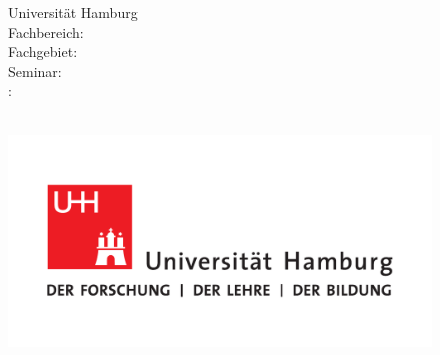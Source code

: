 
\begin{titlepage}

\setcounter{page}{-1}    

\begin{figure}[h]
	\begin{minipage}[t]{8.5cm}
	\flushleft 
			Universität Hamburg \\
			Fachbereich: \fachbereich \\
			Fachgebiet: \fachgebiet \\
			Seminar: \courseOfStudies \\ 
			\supervisorType: \supervisor \\
			\currentSemester \\
	\end{minipage}
	\hfill
   \begin{minipage}[t][2cm][b]{0.4\textwidth}
    \flushright\noindent
    	 \noindent\includegraphics{images/UHH-Logo_2010_Farbe_CMYK.pdf}
    \end{minipage}
\end{figure}

\vspace*{\fill}
\begin{center}
	\vspace{1cm}\noindent {\textbf{\thesisType}} \vspace{0.2cm} \\
	\textbf{\Large \myTitle} \\
	\textbf{\mySubTitle} \\
	\dateOfSubmission \\
\end{center}
\vspace*{\fill}


\end{titlepage}
